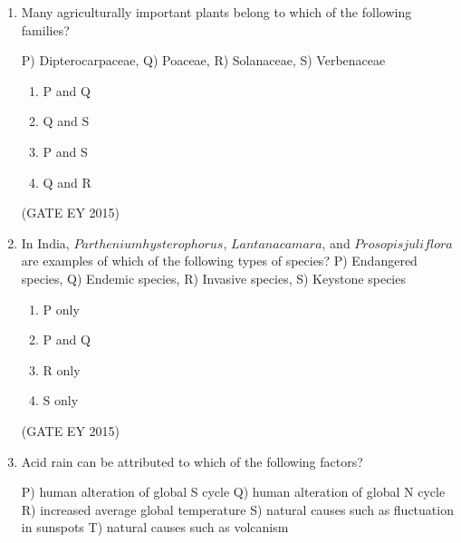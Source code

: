 \documentclass[journal,12pt,onecolumn]{IEEEtran}
\theoremstyle{remark}
\begin{document}
\begin{enumerate}
\begin{multicols}{4}
\begin{enumerate}
    
\item  P and Q
\item  Q and S
\item R and S
\item P and R

    \end{enumerate}
    \end{multicols}
\hfill{(GATE EY 2015)}

\item 
Many agriculturally important plants belong to which of the following families?

P) Dipterocarpaceae, Q) Poaceae, R) Solanaceae, S) Verbenaceae

\begin{multicols}{4}
\begin{enumerate}
    
\item P and Q
\item Q and S
\item P and S 
\item Q and R

    \end{enumerate}
    \end{multicols}
\hfill{(GATE EY 2015)}
\item 
In India, $Parthenium hysterophorus$, $Lantana camara$, and $Prosopis juliflora$ are examples of which of the following types of species?
P) Endangered species, Q) Endemic species, R) Invasive species, S) Keystone species

\begin{multicols}{4}
\begin{enumerate}
    
\item P only
\item P and Q
\item R only
\item S only

    \end{enumerate}
    \end{multicols}
\hfill{(GATE EY 2015)}

\item 
Acid rain can be attributed to which of the following factors?

P) human alteration of global S cycle
Q) human alteration of global N cycle
R) increased average global temperature
S) natural causes such as fluctuation in sunspots
T) natural causes such as volcanism



\end{enumerate}
\end{document}

